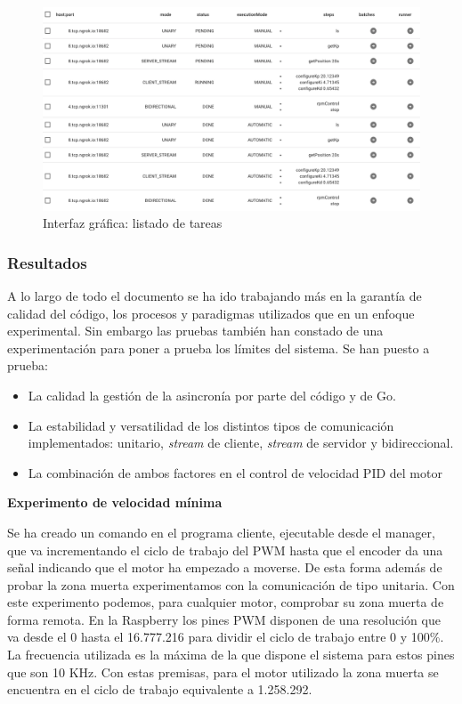\begin{figure}[H]
    \centering
    \includegraphics[height=0.35\textheight]{./part/Ejecucion/Seguimiento/PuestaAPunto/img/UItasks}
    \caption{Interfaz gráfica: listado de tareas}\label{fig:UITasks}
\end{figure}

\subsubsection{Resultados}

A lo largo de todo el documento se ha ido trabajando más en la garantía de calidad del código, los procesos y paradigmas utilizados que en un enfoque experimental.
Sin embargo las pruebas también han constado de una experimentación para poner a prueba los límites del sistema.
Se han puesto a prueba:
\begin{itemize}
    \item La calidad la gestión de la asincronía por parte del código y de Go.
    \item La estabilidad y versatilidad de los distintos tipos de comunicación implementados: unitario, \textit{stream} de cliente, \textit{stream} de servidor y bidireccional.
    \item La combinación de ambos factores en el control de velocidad PID del motor
\end{itemize}

\textbf{Experimento de velocidad mínima}

Se ha creado un comando en el programa cliente, ejecutable desde el manager, que va incrementando el ciclo de trabajo del PWM hasta que el encoder da una señal indicando que el motor ha empezado a moverse.
De esta forma además de probar la zona muerta experimentamos con la comunicación de tipo unitaria.
Con este experimento podemos, para cualquier motor, comprobar su zona muerta de forma remota.
En la Raspberry los pines PWM disponen de una resolución que va desde el 0 hasta el 16.777.216 para dividir el ciclo de trabajo entre 0 y 100\%.
La frecuencia utilizada es la máxima de la que dispone el sistema para estos pines que son 10 KHz.
Con estas premisas, para el motor utilizado la zona muerta se encuentra en el ciclo de trabajo equivalente a 1.258.292.

